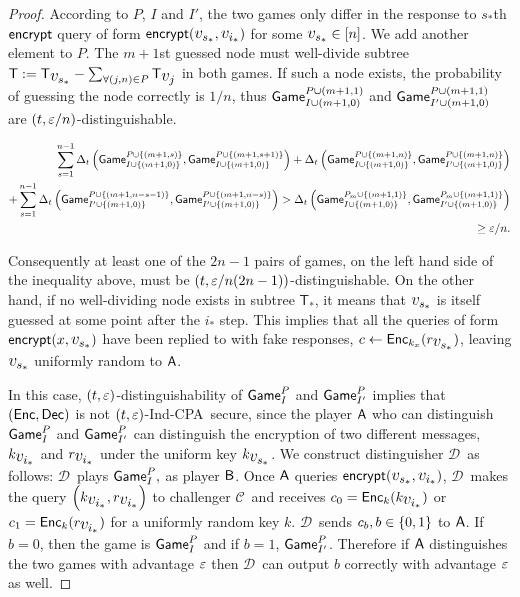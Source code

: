 \documentclass{article}
\newcommand{\tcpa}{$(t,\eps)$-Ind-CPA}
\def\B{{\sf B}}
\def\A{{\sf A}}
\def\a{${\mathcal D}$}
\def\ch{${\mathcal C}$}
\newcommand{\encrypt}{{\sf encrypt}}
\newcommand{\game}{{\sf Game}}
\newcommand{\T}{{\mathsf T}}
\newcommand{\dgg}[2]{\game_{#1}^{#2}}
\newcommand{\bigv}[1]{\mbox{\large $v_{#1}$}}
\begin{document}
\begin{proof}
According to $ P$, $ I$ and $ I'$, the two games only differ in the response to $s_*$th $\encrypt$ query of form $\encrypt(\bigv{s_*},\bigv{i_*})$ for some $\bigv{s_*}\in[n]$. We add another element to $P$. The $m+1$st guessed node must well-divide subtree $\T:=\T_{\bigv{s_*}}- \sum_{\forall (j,n)\in  P}\T_{\bigv{j}}$ in both games. If such a node exists, the probability of guessing the node correctly is $1/n$, thus $\dgg{ I\cup (m+1,0)}{P \cup(m+1,1)}$ and $\dgg{I'\cup (m+1,0) }{P\cup(m+1,1)}$ are $(t,\varepsilon/n)$-distinguishable.


\begin{align*}
\sum_{s=1}^{n-1} \dElta{\dgg{ I\cup\cub{ (m+1,0)}}{ P\cup \cub{(m+1, s)}},\dgg{ I\cup\cub{ (m+1,0)}}{ P\cup \cub{(m+1, s+1)}}}+ \dElta{\dgg{ I\cup\cub{ (m+1,0)}}{ P\cup \cub{(m+1, n)}},\dgg{I'\cup \cub{(m+1,0)}}{ P\cup \cub{(m+1, n)}}} \\+ \sum_{s=1}^{n-1} \dElta{\dgg{I'\cup \cub{(m+1,0)}}{ P\cup \cub{(m+1, n-s-1)}},\dgg{I'\cup\cub{ (m+1,0)}}{ P\cup \cub{(m+1, n-s)}}}
> \dElta{\dgg{ I\cup \cub{(m+1,0)}}{P_{m}\cup \cub{(m+1,1)}},\dgg{I'\cup\cub{ (m+1,0) }}{P_{m}\cup \cub{(m+1,1)}}}\\ \geq \eps/n.
\end{align*}

Consequently at least one of the $2n-1$ pairs of games, on the left hand side of the inequality above, must be $(t,\varepsilon/n(2n-1))$-distinguishable. On the other hand, if no well-dividing node exists in subtree $\T_*$, it means that $\bigv{s_*}$ is itself guessed at some point after the $i_*$ step. This implies that all the queries of form $\encrypt(x,\bigv{s_*})$ have been replied to with fake responses, $c\leftarrow \Enc_{k_x}(r_{\bigv{s_*}})$, leaving $\bigv{s_*}$ uniformly random to $\A$. 

In this case, $(t,\varepsilon)$-distinguishability of $\dgg{ I}{ P}$ and $\dgg{I'}{ P}$ implies that $({\sf Enc},{\sf Dec})$ is not \tcpa~secure, since the player $\A$ who can distinguish $\dgg{ I}{ P}$ and $\dgg{I'}{ P}$ can distinguish the encryption of two different messages, $k_{\bigv{i_*}}$ and $r_{\bigv{i_*}}$ under the uniform key $k_{\bigv{s_*}}$. 
We construct distinguisher \a~as follows: \a~plays $\dgg{ I}{ P},$ as player $\B$. Once $\A$ queries $\encrypt(\bigv{s_*},\bigv{i_*})$, \a~makes the query $\rob{k_{\bigv{i_*}},r_{\bigv{i_*}}}$ to challenger \ch~and receives $c_0= \Enc_k(k_{\bigv{i_*}})$ or $c_1= \Enc_k(r_{\bigv{i_*}})$ for a uniformly random key $k$. \a~sends $c_b, b\in\{0,1\}$ to $\A$. If $b=0$, then the game is $\dgg{ I}{ P}$ and if $b=1$, $\dgg{I'}{ P}$. Therefore if $\A$ distinguishes the two games with advantage $\varepsilon$ then \a~can output $b$ correctly with advantage $\varepsilon$ as well.


\end{proof}
\end{document}
